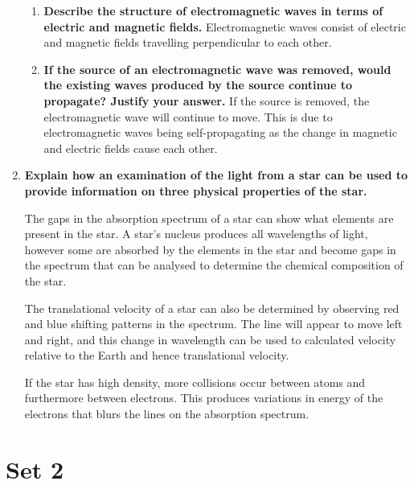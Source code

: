 \documentclass{report}
\begin{document}
\begin{enumerate}
\begin{enumerate}
					\item \textbf{Describe the structure of electromagnetic waves in terms of electric and magnetic fields.}
						\subitem Electromagnetic waves consist of electric and magnetic fields travelling perpendicular to each other.

					\item \textbf{If the source of an electromagnetic wave was removed, would the existing waves produced by the source continue to propagate? Justify your answer.}
						\subitem If the source is removed, the electromagnetic wave will continue to move. This is due to electromagnetic waves being self-propagating as the change in magnetic and electric fields cause each other.
				\end{enumerate}

			\item \textbf{Explain how an examination of the light from a star can be used to provide information on three physical properties of the star.}

				\subitem The gaps in the absorption spectrum of a star can show what elements are present in the star. A star's nucleus produces all wavelengths of light, however some are absorbed by the elements in the star and become gaps in the spectrum that can be analysed to determine the chemical composition of the star.

				The translational velocity of a star can also be determined by observing red and blue shifting patterns in the spectrum. The line will appear to move left and right, and this change in wavelength can be used to calculated velocity relative to the Earth and hence translational velocity.

				If the star has high density, more collisions occur between atoms and furthermore between electrons. This produces variations in energy of the electrons that blurs the lines on the absorption spectrum.
		\end{enumerate}

	\section{Set 2}
	
\end{document}
